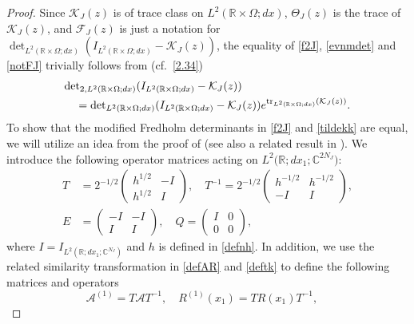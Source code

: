 \begin{proof} Since ${{\mathcal K}}_J(z)$ is of trace class on $L^2({{\mathbb{R}}}\times\Omega; dx)$, 
$\Theta_J(z)$ is the trace of ${{\mathcal K}}_J(z)$, and ${{\mathcal F}}_J(z)$ is just a notation for 
${\det}_{L^2({{\mathbb{R}}}\times\Omega; dx)}(I_{L^2({{\mathbb{R}}}\times\Omega; dx)}- {{\mathcal K}}_J(z))$, the equality of \eqref{f2J}, \eqref{evnmdet} and \eqref{notFJ} trivially follows from 
(cf.\ \eqref{2.34})
\begin{align}
\begin{split}
&{\det}_{2,L^2({{\mathbb{R}}}\times\Omega; dx)} 
(I_{L^2({{\mathbb{R}}}\times\Omega; dx)}- {{\mathcal K}}_J(z))\\
& \quad ={\det}_{L^2({{\mathbb{R}}}\times\Omega; dx)}
(I_{L^2({{\mathbb{R}}}\times\Omega; dx)}- {{\mathcal K}}_J(z))
e^{{\text{\rm{tr}}}_{L^2({{\mathbb{R}}}\times\Omega;dx)} ({{\mathcal K}}_J(z))}.  \label{4.39old}
\end{split}
\end{align}
To show that the modified Fredholm determinants in
\eqref{f2J} and \eqref{tildekk} are equal, we will utilize an idea from the
proof of \cite[Proposition 8.1]{LP07}
(see also a related result in \cite[Theorem 4.7]{GM04}).
We introduce the following operator matrices
acting on $L^2\big({{\mathbb{R}}};dx_1;{{\mathbb{C}}}^{2N_J}\big)$:
\begin{align}\label{deftt}
T&=2^{-1/2}\begin{pmatrix}h^{1/2}&-I
\\h^{1/2}&I\end{pmatrix},\quad
T^{-1}=2^{-1/2}
\begin{pmatrix}h^{-1/2}&h^{-1/2}\\-I&I\end{pmatrix},\\
E&=\begin{pmatrix}-I&-I\\I&I\end{pmatrix},\quad Q=
\begin{pmatrix}I&0\\0&0\end{pmatrix},   \label{EQ}
\end{align}
where $I=I_{L^2({{\mathbb{R}}};dx_1;{{\mathbb{C}}}^{N_J})}$
and $h$ is defined in \eqref{defnh}. In addition, we use the related similarity transformation in \eqref{defAR} and  \eqref{deftk} to define the
following matrices and operators
\begin{equation}\label{simtrans}
{{\mathcal A}}^{(1)} =T{{\mathcal A}} T^{-1}, \quad  R^{(1)}(x_1) =TR(x_1) T^{-1}, \quad 

\end{equation}
\end{proof}
